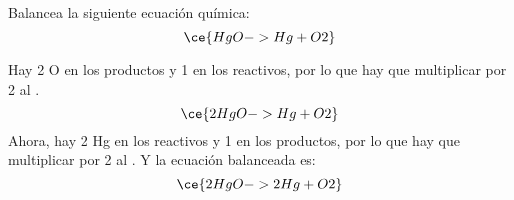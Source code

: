 Balancea la siguiente ecuación química:
\[\ce{HgO -> Hg + O2}\]
\begin{solutionbox}{5cm}
    Hay 2 O en los productos y 1 en los reactivos, por lo que hay que multiplicar por 2 al .
    \[ \ce{2HgO -> Hg + O2}\]
    Ahora, hay 2 Hg en los reactivos y 1 en los productos, por lo que hay que multiplicar por 2 al . Y la ecuación balanceada es:
    \[ \ce{2HgO -> 2Hg + O2}\]
\end{solutionbox}